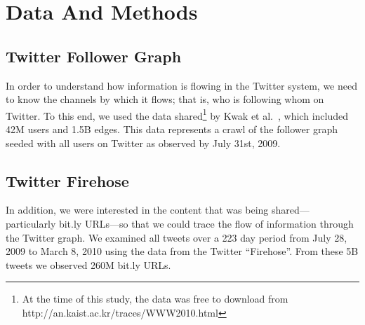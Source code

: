 \documentclass[phd,tocprelim]{cornell}
\begin{document}


\section{Data And Methods}
\subsection{Twitter Follower Graph}
\label{sec:follower}
In order to understand how information is flowing in the Twitter system, we
need to know the channels by which it flows; that is, who is following whom
on Twitter.  To this end, we used the data shared\footnote{At the time of this study, the data was free to download from http://an.kaist.ac.kr/traces/WWW2010.html} by Kwak et al.~\cite{kwak_10}, which included 42M users and 1.5B edges.  This data
represents a crawl of the follower graph seeded with all users on Twitter as observed by July 31st, 2009.

\subsection{Twitter Firehose}
\label{sec:firehose}
In addition, we were interested in the content that was being
shared---particularly bit.ly URLs---so that we could trace the flow of
information through the Twitter graph.  We examined all tweets over a 223
day period from July 28, 2009 to March 8, 2010 using the data from the
Twitter ``Firehose''.  From these 5B tweets we observed 260M bit.ly URLs.
\end{document}
